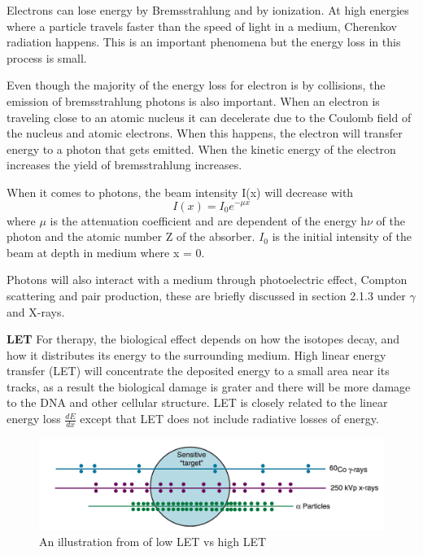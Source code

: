 \documentclass[twoside,english]{uiofysmaster/uiofysmaster}
\begin{document}
Electrons can lose energy by Bremsstrahlung and by ionization. At high energies where a particle travels faster than the speed of light in a medium, Cherenkov radiation happens. This is an important phenomena but the energy loss in this process is small\cite{nuclearchem}.

Even though the majority of the energy loss for electron is by collisions, the emission of bremsstrahlung photons is also important. When an electron is traveling close to an atomic nucleus it can decelerate due to the Coulomb field of the nucleus and atomic electrons. When this happens, the electron will transfer energy to a photon that gets emitted. When the kinetic energy of the electron increases the yield of bremsstrahlung increases.


When it comes to photons, the beam intensity I(x) will decrease with \begin{equation}
    I(x) = I_0e^{-\mu x}
\end{equation}
\noindent
where $\mu$ is the attenuation coefficient and are dependent of the energy h$\nu$ of the photon and the atomic number Z of the absorber\cite{Nuclear_medicine}. $I_0$ is the initial intensity of the beam at depth in medium where x = 0.

Photons will also interact with a medium through photoelectric effect, Compton scattering and pair production, these are briefly discussed in section 2.1.3 under $\gamma$ and X-rays.


\noindent
\textbf{LET}
For therapy, the biological effect depends on how the isotopes decay, and how it distributes its energy to the surrounding medium. High linear energy transfer (LET) will concentrate the deposited energy to a small area near its tracks, as a result the biological damage is grater and there will be more damage to the DNA and other cellular structure. LET is closely related to the linear energy loss $\frac{dE}{dx}$ except that LET does not include radiative losses of energy. 
\begin{figure}[h]
    \centering
    \includegraphics[scale=.4]{low_vs_high_LET.PNG}
    \caption{An illustration from \cite{Zeman2015_chap1} of low LET vs high LET}
    \label{fig:higvslowLET}
\end{figure}
\end{document}
